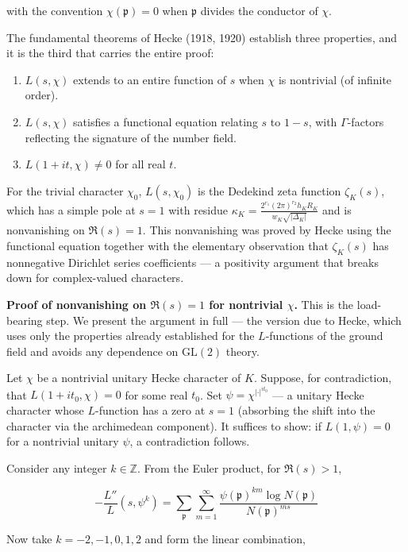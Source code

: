 \documentclass[12pt,a4paper]{article}
\begin{document}
with the convention $\chi(\mathfrak{p}) = 0$ when $\mathfrak{p}$ divides the conductor of $\chi$.

The fundamental theorems of Hecke (1918, 1920) establish three properties, and it is the third that carries the entire proof:

\begin{enumerate}
    \item $L(s, \chi)$ extends to an entire function of $s$ when $\chi$ is nontrivial (of infinite order).
    \item $L(s, \chi)$ satisfies a functional equation relating $s$ to $1-s$, with $\Gamma$-factors reflecting the signature of the number field.
    \item $L(1+it, \chi) \neq 0$ for all real $t$.
\end{enumerate}

For the trivial character $\chi_0$, $L(s, \chi_0)$ is the Dedekind zeta function $\zeta_K(s)$, which has a simple pole at $s=1$ with residue $\kappa_K = \frac{2^{r_1}(2\pi)^{r_2} h_K R_K}{w_K \sqrt{|\Delta_K|}}$ and is nonvanishing on $\Re(s)=1$. This nonvanishing was proved by Hecke using the functional equation together with the elementary observation that $\zeta_K(s)$ has nonnegative Dirichlet series coefficients --- a positivity argument that breaks down for complex-valued characters.

\textbf{Proof of nonvanishing on $\Re(s)=1$ for nontrivial $\chi$.} This is the load-bearing step. We present the argument in full --- the version due to Hecke, which uses only the properties already established for the $L$-functions of the ground field and avoids any dependence on $\mathrm{GL}(2)$ theory.

Let $\chi$ be a nontrivial unitary Hecke character of $K$. Suppose, for contradiction, that $L(1+it_0, \chi) = 0$ for some real $t_0$. Set $\psi = \chi^{|\cdot|^{it_0}}$ --- a unitary Hecke character whose $L$-function has a zero at $s=1$ (absorbing the shift into the character via the archimedean component). It suffices to show: if $L(1, \psi) = 0$ for a nontrivial unitary $\psi$, a contradiction follows.

Consider any integer $k \in \mathbb{Z}$. From the Euler product, for $\Re(s) > 1$,

\[
-\frac{L''}{L}(s, \psi^k) = \sum_{\mathfrak{p}} \sum_{m=1}^{\infty} \frac{\psi(\mathfrak{p})^{km} \log N(\mathfrak{p})}{N(\mathfrak{p})^{ms}}
\]

Now take $k = -2, -1, 0, 1, 2$ and form the linear combination,
\end{document}
